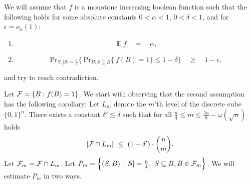 \documentclass[11pt,fleqn]{article}
\begin{document}
\def\H{\{0,1\}^n}

\def\S{S(n,w)}

\def\g{g_{\ast}}
\def\xop{x_{\ast}}
\def\y{y_{\ast}}
\def\z{z_{\ast}}

\def\f{\tilde f}

\def\n{\lfloor \frac n2 \rfloor}


\def \E{\mathop{{}\mathbb E}}
\def \R{\mathbb R}
\def \Z{\mathbb Z}
\def \F{\mathbb F}
\def \T{\mathbb T}

\def \x{\textcolor{red}{x}}
\def \r{\textcolor{red}{r}}
\def \Rc{\textcolor{red}{R}}

\def \noi{{\noindent}}


\def \iff{~~~~\Leftrightarrow~~~~}

\def \queq {\quad = \quad}

\def\<{\left<}
\def\>{\right>}
\def \({\left(}
\def \){\right)}

\def \e{\epsilon}
\def \l{\lambda}


\def\Tp{Tchebyshef polynomial}
\def\Tps{TchebysDeto be the maximafine $A(n,d)$ l size of a code with distance $d$hef polynomials}
\newcommand{\rarrow}{\rightarrow}

\newcommand{\larrow}{\leftarrow}

\overfullrule=0pt
\def\setof#1{\lbrace #1 \rbrace}



\noi We will assume that $f$ is a monotone increasing boolean function such that the following holds for some absolute constants $0 < \alpha < 1$, $0 < \delta < 1$, and for $\e = o_n(1)$:

\begin{enumerate}

\item

\[
\E f \queq \alpha,
\]

\item

\[
\textrm{Pr}_{S,|S| = \frac{n}{4}} \Big\{~\textrm{Pr}_{B: S \subseteq B} \{~f(B) = 1\} \le 1 - \delta \Big\} \quad \ge \quad 1 - \e,
\]

\end{enumerate}

\noi and try to reach contradiction.

\noi Let ${\cal F} = \{B: f(B) = 1\}$.  We start with observing that the second assumption has the following corollary:
\lem
\label{lem:levels}
Let $L_m$ denote the $m$'th level of the discrete cube $\H$. There exists a constant $\delta' \lesssim \delta$ such that for all $\frac{n}{4} \le m \le \frac{5n}{8} - \omega\(\sqrt{n}\)$ holds
\[
|{\cal F} \cap L_m| ~\le~ \(1 - \delta'\) \cdot {n \choose m}.
\]
\elem
\prf
Let ${\cal F}_m = {\cal F} \cap L_m$. Let $P_m = \Big\{(S,B): |S| = \frac{n}{4},~S \subseteq B, B \in {\cal F}_m\Big\}$. We will estimate $P_m$ in two ways. 
\end{document}
